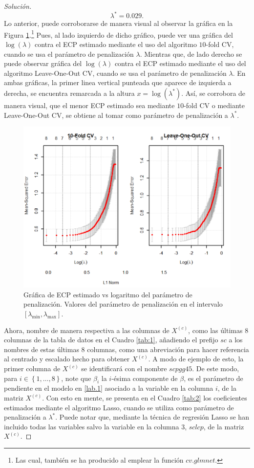 \documentclass[10.5pt,notitlepage]{article}
\newenvironment{solucion}
  {\begin{proof}[Solución]}
  {\end{proof}}
\newcommand{\kis}[1]{\left\{ #1 \right\}}
\theoremstyle{plain}
\begin{document}
\begin{solucion}
\[
\lambda^* = 0.029.
\]
Lo anterior, puede corroborarse de manera visual al observar la gráfica en la Figura \ref{fig:2}.\footnote{Las cual, también se ha producido al emplear la función \(cv.glmnet\).} Pues, al lado izquierdo de dicho gráfico, puede ver una gráfica del \(\log(\lambda)\) contra el ECP estimado mediante el uso del algoritmo \(10\)-fold CV, cuando se usa el parámetro de penalización \(\lambda\). Mientras que, de lado derecho se puede observar gráfica del \(\log(\lambda)\) contra el ECP estimado mediante el uso del algoritmo Leave-One-Out CV, cuando se usa el parámetro de penalización \(\lambda\). En ambas gráficas, la primer linea vertical punteada que aparece de izquierda a derecha, se encuentra remarcada a la altura \(x  =\log(\lambda^*)\). Así, se corrobora de manera visual, que el menor ECP estimado sea mediante \(10\)-fold CV o mediante Leave-One-Out CV, se obtiene al tomar como parámetro de penalización a \(\lambda^*\). 
\begin{figure}[htb]
    \centering
    \includegraphics[scale = 0.5]{CV.png}
    \caption{Gráfica de ECP estimado vs logaritmo del parámetro de penalización. Valores del parámetro de penalización en el intervalo \([\lambda_{\min}, \lambda_{\max}]\).}
    \label{fig:2}
\end{figure}
Ahora, nombre de manera respectiva a las columnas de \(X^{(c)}\), como las últimas \(8\) columnas de la tabla de datos en el Cuadro \ref{tab:1}, añadiendo el prefijo \(sc\) a los nombres de estas últimas \(8\) columnas, como una abreviación para hacer referencia al centrado y escalado hecho para obtener \(X^{(c)}\). A modo de ejemplo de esto, la primer columna de \(X^{(c)}\) se identificará con el nombre \(scpgg45\). De este modo, para \(i \in \kis{1,\hdots,8}\), note que \(\beta_i\) la \(i\)-ésima componente de \(\beta\), es el parámetro de pendiente en el modelo en \eqref{lab.1} asociado a la variable en la columna \(i\), de la matriz \(X^{(c)}\). Con esto en mente, se presenta en el Cuadro \ref{tab:2} los coeficientes estimados mediante el algoritmo Lasso, cuando se utiliza como parámetro de penalización a \(\lambda^*\). Puede notar que, mediante la técnica de regresión Lasso se han incluido todas las variables salvo la variable en la columna \(3\), \(sclcp\), de la matriz \(X^{(c)}\).  

\end{solucion}
\end{document}
